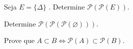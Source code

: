 \item  Seja $E = \{\Delta\}$ . Determine $\mathcal{P}(\mathcal{P}(E))$.
	
\item Determine $\mathcal{P}(\mathcal{P}(\mathcal{P}( \varnothing )))$.
\item Prove que $A \subset B \Leftrightarrow \mathcal{P}(A) \subset \mathcal{P}(B).$
